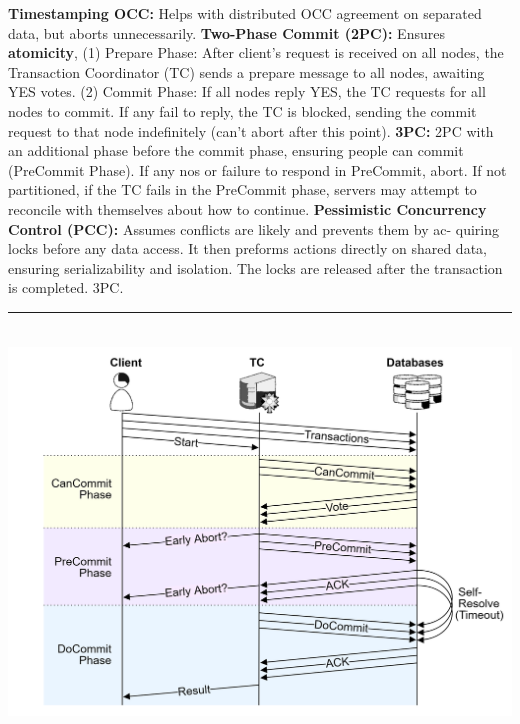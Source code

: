 \begin{multicols}{2}
\textbf{Timestamping OCC:} Helps with distributed OCC agreement on separated data, but aborts unnecessarily.
\textbf{Two-Phase Commit (2PC):} Ensures \textbf{atomicity}, (1) Prepare Phase: After client's request is received on all nodes, the Transaction Coordinator (TC) sends a prepare message to all nodes, awaiting YES votes. 
(2) Commit Phase: If all nodes reply YES, the TC requests for all nodes to commit. If any fail to reply, the TC is blocked, sending the commit request to that node indefinitely (can't abort after this point).
\textbf{3PC:} 2PC with an additional phase before the commit phase, ensuring people can commit (PreCommit Phase). If any nos or failure to respond in PreCommit, abort. If not 
partitioned, if the TC fails in the PreCommit phase, servers may attempt to reconcile with themselves about how to continue.
\textbf{Pessimistic Concurrency Control (PCC):} Assumes conflicts are likely and prevents them by ac-
quiring locks before any data access. It then preforms actions directly on shared data, ensuring
serializability and isolation. The locks are released after the transaction is completed. 3PC.

\noindent
\rule{\linewidth}{0.4pt}\\

\hspace{-1.5em}
\includegraphics[width=\linewidth]{Sections/trans/3PC.png}\\

\end{multicols}

\newpage

